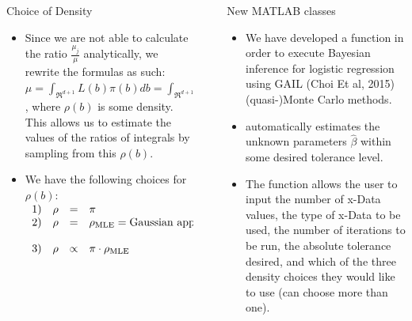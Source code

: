 \documentclass[final,mathserif]{beamer}
\newcommand{\blue}[1]{{\color{myblue}#1}}
\renewcommand{\blue}{\textcolor{blue!80!black}}
\begin{document}
\begin{frame}[fragile]
\begin{columns}[t]
\begin{column}{.31\linewidth}
\begin{block}{\blue{Choice of Density}}
\begin{itemize}
\item Since we are not able to calculate the ratio $\frac{\mu_j}{\mu}$ analytically, we rewrite the formulas as such: $\mu=\int_{\Re^{d+1}}L(b)\pi(b)db=\int_{\Re^{d+1}}\frac{L(b)\pi(b)}{\rho(b)}\rho(b)db$, where $\rho(b)$ is some density.  This allows us to estimate the values of the ratios of integrals by sampling from this $\rho(b)$.
\item  We have the following choices for $\rho(b)$:
$\begin{array}{rrcl}
1) & \rho & = & \pi \\
2) & \rho & = & \rho_{\text{MLE}} = \text{Gaussian approximation to the}\\ 
&&&\hspace{5.5cm} \text{likelihood}\\
3) & \rho & \propto & \pi \cdot \rho_{\text{MLE}}
\end{array}$

\end{itemize}
\end{block}

\end{column}

\begin{column}{.015\linewidth} \end{column} %

\begin{column}{.31\linewidth}

\begin{block}{\blue{New MATLAB classes}}
\begin{itemize}

\item We have developed a \alert{function}  in order to execute Bayesian inference for logistic regression using GAIL (Choi Et al, 2015) (quasi-)Monte Carlo methods. 

\item {} \alert{automatically} estimates the unknown parameters $\hat{\beta}$ within some desired tolerance level.

\item The function allows the user to input the number of x-Data values, the type of x-Data to be used, the number of iterations to be run, the absolute tolerance desired, and which of the three density choices they would like to use (can choose more than one).


\end{itemize}
\end{block}
\end{column}
\end{columns}
\end{frame}
\end{document}
